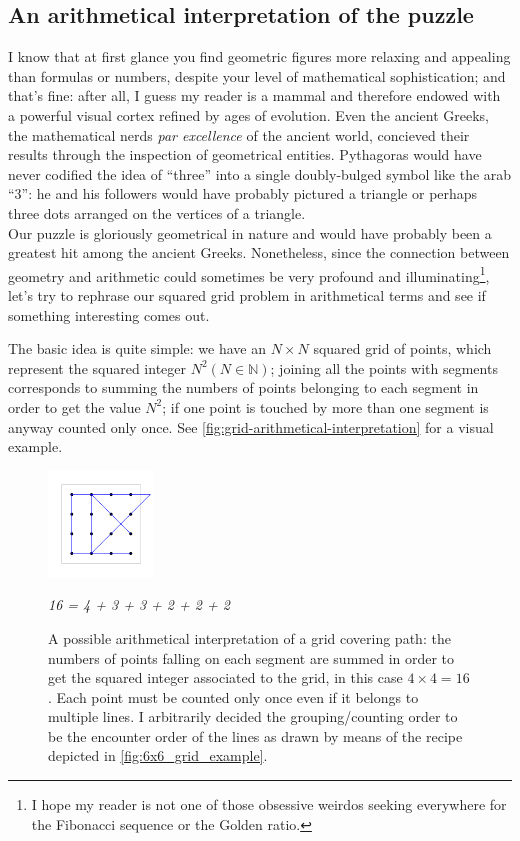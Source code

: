 \documentclass[11pt]{article}
\newcommand{\quotes}[1]{``#1''}
\begin{document}
\hypertarget{arithmetical-interpretation} {
	\subsection{An arithmetical interpretation of the puzzle}
	\label{arithmetical-interpretation}
}
I know that at first glance you find geometric figures more relaxing and appealing than formulas or numbers, despite your level of mathematical sophistication; and that's fine: after all, I guess my reader is a mammal and therefore endowed with a powerful visual cortex refined by ages of evolution. Even the ancient Greeks, the mathematical nerds \emph{par excellence} of the ancient world, concieved their results through the inspection of geometrical entities. Pythagoras would have never codified the idea of \quotes{three} into a single doubly-bulged symbol like the arab \quotes{3}: he and his followers would have probably pictured a triangle or perhaps three dots arranged on the vertices of a triangle.\\
Our puzzle is gloriously geometrical in nature and would have probably been a greatest hit among the ancient Greeks. Nonetheless, since the connection between geometry and arithmetic could sometimes be very profound and illuminating\footnote{I hope my reader is not one of those obsessive weirdos seeking everywhere for the Fibonacci sequence or the Golden ratio.}, let's try to rephrase our squared grid problem in arithmetical terms and see if something interesting comes out.

The basic idea is quite simple: we have an $N\times N$ squared grid of points, which represent the squared integer $N^{2} (N \in \mathbb{N})$; joining all the points with segments corresponds to summing the numbers of points belonging to each segment in order to get the value $N^2$; if one point is touched by more than one segment is anyway counted only once. See \autoref{fig:grid-arithmetical-interpretation} for a visual example.
\begin{figure}[H]
\centering
\includegraphics[width=0.25\textwidth]{images/4x4_grid_iteration_solution.png}
\caption*{\emph{16 = 4 + 3 + 3 + 2 + 2 + 2}}
\caption{A possible arithmetical interpretation of a grid covering path: the numbers of points falling on each segment are summed in order to get the squared integer associated to the grid, in this case $4\times 4=16$. Each point must be counted only once even if it belongs to multiple lines. I arbitrarily decided the grouping/counting order to be the encounter order of the lines as drawn by means of the recipe depicted in \autoref{fig:6x6_grid_example}.}
\label{fig:grid-arithmetical-interpretation}
\end{figure}
\end{document}
